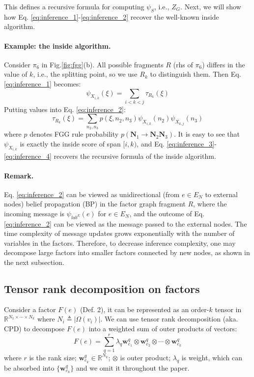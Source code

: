 \documentclass[11pt]{article}
\newcommand{\vect}[1]{\boldsymbol{\mathbf{#1}}}
\newcommand{\rv}[1]{\mathbf{#1}}
\begin{document}
This defines a recursive formula for computing $\psi_{S}$, i.e., $Z_G$.  Next, we will show how Eq. \ref{eq:inference_1}-\ref{eq:inference_2} recover the well-known inside algorithm.

\paragraph{Example: the inside algorithm.} 
Consider $\pi_6$ in Fig.\ref{fig:fgg}(b). All possible fragments $R$ (rhs of $\pi_6$) differs in the value of $k$, i.e., the splitting point, so we use $R_k$ to distinguish them. Then Eq. \ref{eq:inference_1} becomes:
\begin{equation}
 \psi_{X_{i,k}}(\xi) = \sum_{i<k<j} \tau_{R_k} (\xi)
 \label{eq:inference_3}
\end{equation}
Putting values into Eq. \ref{eq:inference_2}:
\begin{equation}
\tau_{R_k}(\xi) = \sum_{n_2, n_3} p(\xi, n_2, n_3) \psi_{X_{i,k}}(n_2) \psi_{X_{k, j}}(n_3)
\label{eq:inference_4}
\end{equation}
where $p$ denotes FGG rule probability $p(\rv{N}_1\rightarrow \rv{N}_2 \rv{N}_3)$. It is easy to see that $\psi_{X_{i,k}}$ is exactly the inside score of span $[i, k)$, and Eq. \ref{eq:inference_3}-\ref{eq:inference_4} recovers the recursive formula of the inside algorithm.


\paragraph{Remark.} Eq. \ref{eq:inference_2} can be viewed as unidirectional (from $e \in E_{N}$ to external nodes) belief propagation (BP) in the factor graph fragment $R$, where the incoming message is $\psi_{lab^E}(e)$ for $e \in E_{N}$, and the outcome of Eq. \ref{eq:inference_2} can be viewed as the message passed to the external nodes. The time complexity of message updates grows exponentially with the number of variables in the factors. Therefore, to decrease inference complexity, one may decompose large factors into smaller factors connected by new nodes, 
as shown in the next subsection.

\subsection{Tensor rank decomposition on factors}
Consider a factor $F(e)$ (Def. 2), it can be represented as an order-$k$ tensor in $\mathbb{R}^{N_1 \times \cdots \times N_{k}}$ where $N_{i} \triangleq |\Omega(v_i)|$. We can use tensor rank decomposition (aka. CPD) to decompose $F(e)$ into a weighted sum of outer products of vectors:
\[
F(e) =\sum_{q=1}^{r} \lambda_{q} \vect{w}_{e_1}^{q} \otimes \vect{w}_{e_2}^{q} \otimes \cdots \otimes \vect{w}_{e_k}^{q}
\]
where $r$ is the rank size; $\vect{w}_{e_k}^{q} \in \mathbb{R}^{N_k}$; $\otimes$ is outer product;  $\lambda_q$ is weight, which can be absorbed into $\{\vect{w}_{e_k}^{q}\}$ and we omit it throughout the paper.
\end{document}
